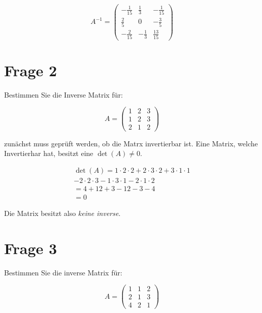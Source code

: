 \[
    A^{-1} = \begin{pmatrix}
        -\frac{1}{15} & \frac{1}{3}  & -\frac{1}{15} \\
        \frac{2}{5}   & 0            & -\frac{3}{5}  \\
        -\frac{2}{15} & -\frac{1}{3} & \frac{13}{15}
    \end{pmatrix}
\]

\section{Frage 2}

Bestimmen Sie die Inverse Matrix für:

\[
    A = \begin{pmatrix}
        1 & 2 & 3 \\
        1 & 2 & 3 \\
        2 & 1 & 2
    \end{pmatrix}
\]

zunächst muss geprüft werden, ob die Matrx invertierbar ist. Eine Matrix,
welche Invertierhar hat, besitzt eine $\det(A) \neq 0$.

\begin{align*}
    \det(A) = 1 \cdot 2 \cdot 2 + 2 \cdot 3 \cdot 2 + 3 \cdot 1 \cdot 1 \\
    - 2 \cdot 2 \cdot 3 - 1 \cdot 3 \cdot 1 - 2 \cdot 1 \cdot 2         \\
    = 4 + 12 + 3 - 12 - 3 - 4                                           \\
    = 0
\end{align*}

Die Matrix besitzt also \textit{keine inverse}.

\section{Frage 3}

Bestimmen Sie die inverse Matrix für:

\[
    A = \begin{pmatrix}
        1 & 1 & 2 \\
        2 & 1 & 3 \\
        4 & 2 & 1
    \end{pmatrix}
\]

